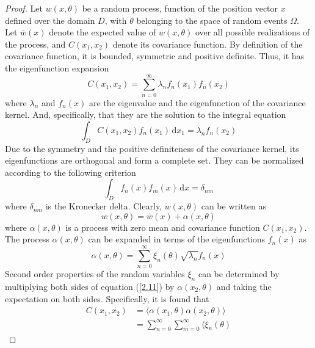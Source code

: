 \documentclass{article}
\begin{document}
\begin{proof}
Let $w (x, \theta)$ be a random process, function of the position vector $x$
defined over the domain $D$, with $\theta$ belonging to the space of random
events $\Omega$. Let $\bar{w} (x)$ denote the expected value of $w (x,
\theta)$ over all possible realizations of the process, and $C (x_1, x_2)$
denote its covariance function. By definition of the covariance function, it
is bounded, symmetric and positive definite. Thus, it has the eigenfunction
expansion
\begin{equation}
C (x_1, x_2) = \sum_{n = 0}^{\infty} \lambda_n f_n (x_1) f_n (x_2)
\label{2.7}
\end{equation}
where $\lambda_n$ and $f_n (x)$ are the eigenvalue and the eigenfunction of
the covariance kernel. And, specifically, that they are the solution to the
integral equation
\begin{equation}
\int_D C (x_1, x_2) f_n (x_1) \, \mathrm{d}x_1 = \lambda_n f_n (x_2) \label{2.8}
\end{equation}
Due to the symmetry and the positive definiteness of the covariance kernel,
its eigenfunctions are orthogonal and form a complete set. They can be
normalized according to the following criterion
\begin{equation}
\int_D f_n (x) f_m (x) \, \mathrm{d}x = \delta_{nm} \label{2.9}
\end{equation}
where $\delta_{nm}$ is the Kronecker delta. Clearly, $w (x, \theta)$ can be
written as
\begin{equation}
w (x, \theta) = \bar{w} (x) + \alpha (x, \theta) \label{2.10}
\end{equation}
where $\alpha (x, \theta)$ is a process with zero mean and covariance
function $C (x_1, x_2)$. The process $\alpha (x, \theta)$ can be expanded in
terms of the eigenfunctions $f_n (x)$ as
\begin{equation}
\alpha (x, \theta) = \sum_{n = 0}^{\infty} \xi_n (\theta) \sqrt{\lambda_n}
f_n (x) \label{2.11}
\end{equation}
Second order properties of the random variables $\xi_n$ can be determined by
multiplying both sides of equation (\ref{2.11}) by $\alpha (x_2, \theta)$
and taking the expectation on both sides. Specifically, it is found that
\begin{equation}
\begin{array}{ll}
C (x_1, x_2) & = \langle \alpha (x_1, \theta) \alpha (x_2, \theta)
\rangle\\
& = \sum_{n = 0}^{\infty} \sum_{m = 0}^{\infty} \langle \xi_n (\theta)

\end{array}
\end{equation}
\end{proof}
\end{document}
